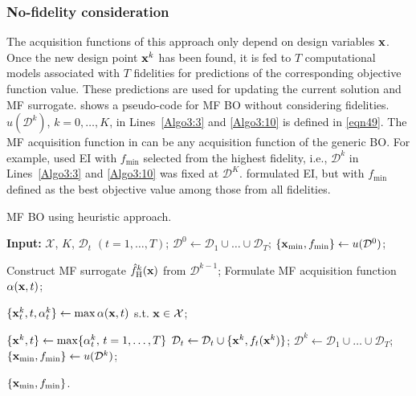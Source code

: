 \documentclass[iicol,sn-basic]{sn-jnl}%
\begin{document}
\subsubsection{No-fidelity consideration}\label{Sec521}

The acquisition functions of this approach only depend on design variables $\bf x$.
Once the new design point ${\bf x}^k$ has been found, it is fed to $T$ computational models associated with $T$ fidelities for predictions of the corresponding objective function value.
These predictions are used for updating the current solution and MF surrogate.
 shows a pseudo-code for MF BO without considering fidelities.
$u(\mathcal{D}^k)$, $k=0,\dots,K$, in Lines~\ref{Algo3:3} and \ref{Algo3:10} is defined in \cref{eqn49}.
The MF acquisition function in  can be any acquisition function of the generic BO.
For example, \cite{Forrester2007} used EI with $f_{\min}$ selected from the highest fidelity, i.e., $\mathcal{D}^k$ in Lines~\ref{Algo3:3} and \ref{Algo3:10} was fixed at $\mathcal{D}^K$.
\cite{Perdikaris2016} formulated EI, but with $f_{\min}$ defined as the best objective value among those from all fidelities.
 

\begin{algorithm}
	\caption{MF BO using heuristic approach.}\label{Algo4}
	\begin{algorithmic}[1]
		\State \textbf{Input:} $\mathcal{X}$, $K$, $\mathcal{D}_t$ $(t=1,\dots,T)$;
		\State $\mathcal{D}^0 \gets \mathcal{D}_1 \cup \dots \cup \mathcal{D}_T$;
		\State $\{{\bf x}_{\min},f_{\min}\} \gets u(\mathcal{D}^0)$;
		
		\State Construct MF surrogate $\hat{f}_\text{H}^k({\bf x})$ from $\mathcal{D}^{k-1}$;
		\State Formulate MF acquisition function $\alpha({\bf x},t)$;
		
		 \label{Algo4:7}
		\State $\{{\bf x}_t^{k},t,\alpha_t^k\} \gets {\max}\, \alpha({\bf x},t)$ s.t. ${\bf x} \in \mathcal{X}$;
		\EndFor
		
		\State $\{{\bf x}^{k},t\} \gets\max\{\alpha_t^k,\, t=1,\dots, T\}$ \label{Algo4:10}
		\State $\mathcal{D}_t \gets \mathcal{D}_t \cup \{{\bf x}^{k},f_t({\bf x}^{k})\}$;
		\State $\mathcal{D}^k \gets \mathcal{D}_1 \cup \dots \cup \mathcal{D}_T$;
		\State $\{{\bf x}_{\min},f_{\min}\} \gets u(\mathcal{D}^k)$;
		\EndFor
		
		\State \Return $\{{\bf x}_{\min},f_{\min}\}$.
	\end{algorithmic}
\end{algorithm}
\end{document}
